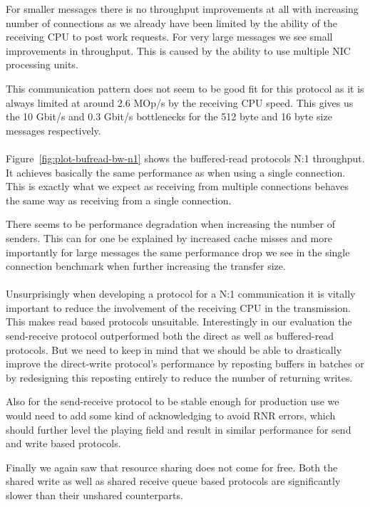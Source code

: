 For smaller messages there is no throughput improvements at all with increasing number of connections as we already have 
been limited by the ability of the receiving CPU to post work requests. For very large messages we see small improvements
in throughput. This is caused by the ability to use multiple NIC processing units.

This communication pattern does not seem to be good fit for this protocol as it is always limited at around 
2.6 MOp/s by the receiving CPU speed. This gives us the 10 Gbit/s and 0.3 Gbit/s bottlenecks for the 512 byte and
16 byte size messages respectively.

\paragraph{} Figure~\ref{fig:plot-bufread-bw-n1} shows the buffered-read protocols N:1 throughput. It achieves basically the 
same performance as when using a single connection. This is exactly what we expect as receiving from multiple connections
behaves the same way as receiving from a single connection.

There seems to be performance degradation when increasing the number of senders. This can for one be explained
by increased cache misses and more importantly for large messages the same performance drop we see in the single connection 
benchmark when further increasing the transfer size.


\paragraph{} Unsurprisingly when developing a protocol for a N:1 communication it is vitally important to reduce the 
involvement of the receiving CPU in the transmission. This makes read based protocols unsuitable. Interestingly in our
evaluation the send-receive protocol outperformed both the direct as well as buffered-read protocols. But we need to 
keep in mind that we should be able to drastically improve the direct-write protocol's performance by reposting
buffers in batches or by redesigning this reposting entirely to reduce the number of returning writes.

Also for the send-receive protocol to be stable enough for production use we would need to add some kind of acknowledging to
avoid RNR errors, which should further level the playing field and result in similar performance for send and write based 
protocols.

Finally we again saw that resource sharing does not come for free. Both the shared write as well as shared receive queue based
protocols are significantly slower than their unshared counterparts. 








